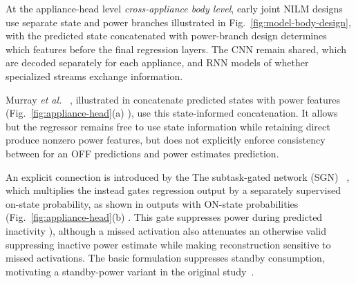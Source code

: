 \documentclass[journal]{IEEEtran}
\providecommand{\DIFadd}[1]{{\protect\color{blue} \sf #1}} %
\providecommand{\DIFdel}[1]{{\protect\color{red} \scriptsize #1}} %
\providecommand{\DIFaddbegin}{} %
\providecommand{\DIFaddend}{} %
\providecommand{\DIFdelbegin}{} %
\providecommand{\DIFdelend}{} %
\providecommand{\DIFscaledelfig}{0.5}
\newlength{\DIFdelgraphicswidth} %
\newlength{\DIFdelgraphicsheight} %
\providecommand{\DIFaddincludegraphics}[2][]{{\color{blue}\fbox{\DIFOincludegraphics[#1]{#2}}}} %
\providecommand{\DIFdelincludegraphics}[2][]{%
\sbox{\DIFdelgraphicsbox}{\DIFOincludegraphics[#1]{#2}}%
\settoboxwidth{\DIFdelgraphicswidth}{\DIFdelgraphicsbox} %
\settoboxtotalheight{\DIFdelgraphicsheight}{\DIFdelgraphicsbox} %
\scalebox{\DIFscaledelfig}{%
\parbox[b]{\DIFdelgraphicswidth}{\usebox{\DIFdelgraphicsbox}\\[-\baselineskip] \rule{\DIFdelgraphicswidth}{0em}}\llap{\resizebox{\DIFdelgraphicswidth}{\DIFdelgraphicsheight}{%
\setlength{\unitlength}{\DIFdelgraphicswidth}%
\begin{picture}(1,1)%
\thicklines\linethickness{2pt} %
{\color[rgb]{1,0,0}\put(0,0){\framebox(1,1){}}}%
{\color[rgb]{1,0,0}\put(0,0){\line( 1,1){1}}}%
{\color[rgb]{1,0,0}\put(0,1){\line(1,-1){1}}}%
\end{picture}%
}\hspace*{3pt}}} %
} %
\DeclareRobustCommand{\DIFaddbegin}{\DIFOaddbegin \let\includegraphics\DIFaddincludegraphics} %
\DeclareRobustCommand{\DIFaddend}{\DIFOaddend \let\includegraphics\DIFOincludegraphics} %
\DeclareRobustCommand{\DIFdelbegin}{\DIFOdelbegin \let\includegraphics\DIFdelincludegraphics} %
\DeclareRobustCommand{\DIFdelend}{\DIFOaddend \let\includegraphics\DIFOincludegraphics} %
\begin{document}
\DIFdelend At the \DIFdelbegin \DIFdel{appliance-head level}\DIFdelend \DIFaddbegin \DIFadd{\emph{cross-appliance body level}}\DIFaddend , \DIFdelbegin \DIFdel{early joint NILM designs use separate state and power branches}\DIFdelend \DIFaddbegin \DIFadd{illustrated in Fig.~\ref{fig:model-body-design}}\DIFaddend , \DIFdelbegin \DIFdel{with }\DIFdelend the \DIFdelbegin \DIFdel{predicted state concatenated with power-branch }\DIFdelend \DIFaddbegin \DIFadd{design determines which }\DIFaddend features \DIFdelbegin \DIFdel{before the final regression layers. The CNN }\DIFdelend \DIFaddbegin \DIFadd{remain shared, which are decoded separately for each appliance, }\DIFaddend and \DIFdelbegin \DIFdel{RNN models of }\DIFdelend \DIFaddbegin \DIFadd{whether specialized streams exchange information.
}

\DIFaddend Murray \emph{et al.}~\cite{murray2019transferability} \DIFdelbegin \DIFdel{, illustrated in }\DIFdelend \DIFaddbegin \DIFadd{concatenate predicted states with power features (}\DIFaddend Fig.~\ref{fig:appliance-head}(a)\DIFaddbegin \DIFadd{)}\DIFaddend , \DIFdelbegin \DIFdel{use this state-informed concatenation. It allows }\DIFdelend \DIFaddbegin \DIFadd{but }\DIFaddend the regressor \DIFaddbegin \DIFadd{remains free }\DIFaddend to \DIFdelbegin \DIFdel{use state information while retaining direct }\DIFdelend \DIFaddbegin \DIFadd{produce nonzero }\DIFaddend power \DIFdelbegin \DIFdel{features, but does not explicitly enforce consistency between }\DIFdelend \DIFaddbegin \DIFadd{for an }\DIFaddend OFF \DIFdelbegin \DIFdel{predictions and power estimates}\DIFdelend \DIFaddbegin \DIFadd{prediction}\DIFaddend . \DIFdelbegin %

\DIFdel{An explicit connection is introduced by the }\DIFdelend \DIFaddbegin \DIFadd{The }\DIFaddend subtask-gated network (SGN)~\cite{shin2019sgn} \DIFdelbegin \DIFdel{, which multiplies the }\DIFdelend \DIFaddbegin \DIFadd{instead gates }\DIFaddend regression \DIFdelbegin \DIFdel{output by a separately supervised on-state probability, as shown in }\DIFdelend \DIFaddbegin \DIFadd{outputs with ON-state probabilities (}\DIFaddend Fig.~\ref{fig:appliance-head}(b)\DIFdelbegin \DIFdel{. This gate suppresses power during predicted inactivity}\DIFdelend \DIFaddbegin \DIFadd{)}\DIFaddend , \DIFdelbegin \DIFdel{although a missed activation also attenuates an otherwise valid }\DIFdelend \DIFaddbegin \DIFadd{suppressing inactive }\DIFaddend power \DIFdelbegin \DIFdel{estimate}\DIFdelend \DIFaddbegin \DIFadd{while making reconstruction sensitive to missed activations}\DIFaddend . The \DIFdelbegin \DIFdel{basic formulation suppresses standby consumption, motivating a standby-power variant in the original study~\cite{shin2019sgn}.
}%
\end{document}
